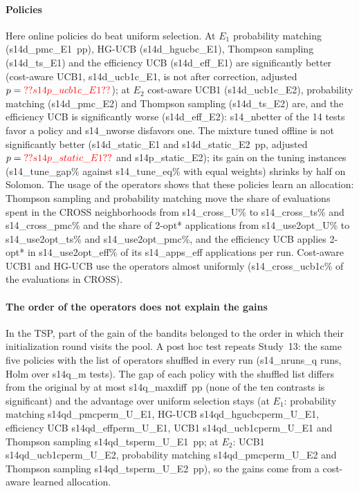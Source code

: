

\paragraph{Policies} Here online policies do beat uniform selection. At $E_1$ probability matching (\num{s14d_pmc_E1}~pp), HG-UCB (\num{s14d_hgucbc_E1}), Thompson sampling (\num{s14d_ts_E1}) and the efficiency UCB (\num{s14d_eff_E1}) are significantly better (cost-aware UCB1, \num{s14d_ucb1c_E1}, is not after correction, adjusted $p=\num{s14p_ucb1c_E1}$); at $E_2$ cost-aware UCB1 (\num{s14d_ucb1c_E2}), probability matching (\num{s14d_pmc_E2}) and Thompson sampling (\num{s14d_ts_E2}) are, and the efficiency UCB is significantly worse (\num{s14d_eff_E2}): \num{s14_nbetter} of the 14 tests favor a policy and \num{s14_nworse} disfavors one. The mixture tuned offline is not significantly better (\num{s14d_static_E1} and \num{s14d_static_E2}~pp, adjusted $p=\num{s14p_static_E1}$ and \num{s14p_static_E2}); its gain on the tuning instances (\num{s14_tune_gap}\% against \num{s14_tune_eq}\% with equal weights) shrinks by half on Solomon. The usage of the operators shows that these policies learn an allocation: Thompson sampling and probability matching move the share of evaluations spent in the CROSS neighborhoods from \num{s14_cross_U}\% to \num{s14_cross_ts}\% and \num{s14_cross_pmc}\% and the share of 2-opt* applications from \num{s14_use2opt_U}\% to \num{s14_use2opt_ts}\% and \num{s14_use2opt_pmc}\%, and the efficiency UCB applies 2-opt* in \num{s14_use2opt_eff}\% of its \num{s14_apps_eff} applications per run. Cost-aware UCB1 and HG-UCB use the operators almost uniformly (\num{s14_cross_ucb1c}\% of the evaluations in CROSS).

\paragraph{The order of the operators does not explain the gains} In the TSP, part of the gain of the bandits belonged to the order in which their initialization round visits the pool. A post hoc test repeats Study~13: the same five policies with the list of operators shuffled in every run (\num{s14_nruns_q} runs, Holm over \num{s14q_m} tests). The gap of each policy with the shuffled list differs from the original by at most \num{s14q_maxdiff}~pp (none of the ten contrasts is significant) and the advantage over uniform selection stays (at $E_1$: probability matching \num{s14qd_pmcperm_U_E1}, HG-UCB \num{s14qd_hgucbcperm_U_E1}, efficiency UCB \num{s14qd_effperm_U_E1}, UCB1 \num{s14qd_ucb1cperm_U_E1} and Thompson sampling \num{s14qd_tsperm_U_E1}~pp; at $E_2$: UCB1 \num{s14qd_ucb1cperm_U_E2}, probability matching \num{s14qd_pmcperm_U_E2} and Thompson sampling \num{s14qd_tsperm_U_E2}~pp), so the gains come from a cost-aware learned allocation.

